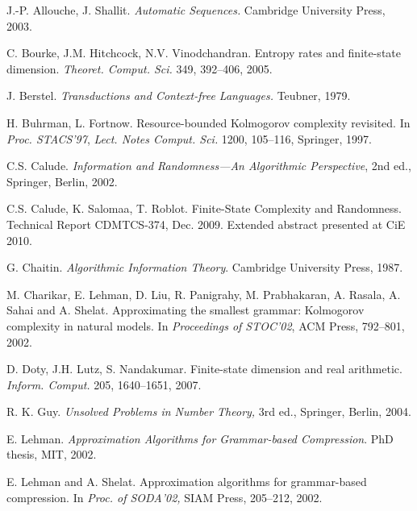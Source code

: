 \documentclass[copyright]{eptcs}
\begin{document}
{\small
\begin{thebibliography}{99}

 J.-P. Allouche, J. Shallit.
{\em Automatic Sequences.} Cambridge University Press, 2003.





 C. Bourke, J.M. Hitchcock,
N.V. Vinodchandran. Entropy rates and finite-state
dimension.
{\em Theoret. Comput. Sci.} 349, 392--406, 2005.

 J. Berstel.
{\em Transductions and Context-free Languages.}
Teubner, 1979.

  H. Buhrman, L. Fortnow. Resource-bounded Kolmogorov complexity
revisited. In {\em  Proc. STACS'97}, {\em Lect. Notes Comput.
Sci.} 1200, 105--116, Springer, 1997.

C.S. Calude.
{\em Information and Randomness---An Algorithmic Perspective}, 2nd
 ed., Springer, Berlin, 2002. 


 C.S. Calude, K. Salomaa, T. Roblot.
Finite-State Complexity and Randomness. 
Technical Report CDMTCS-374, Dec. 2009. Extended
abstract presented at CiE 2010.



 G. Chaitin. {\em Algorithmic Information Theory}. 
Cambridge 
University Press, 1987.

 M. Charikar, E. Lehman, D. Liu, R. Panigrahy,
M. Prabhakaran, A. Rasala, A. Sahai and A. Shelat.
Approximating the smallest grammar: Kolmogorov complexity in natural
models. In {\em  Proceedings of STOC'02}, ACM Press,   792--801, 2002.










 D. Doty, J.H. Lutz, S. Nandakumar.
Finite-state dimension and real arithmetic.
{\em Inform. Comput.} 205, 1640--1651, 2007.


 R. K. Guy.
{\em Unsolved Problems in Number Theory,} 3rd ed.,
Springer, Berlin, 2004.

 E. Lehman.
{\em Approximation Algorithms for Grammar-based Compression}.
PhD thesis, MIT, 2002.

 E. Lehman and A. Shelat.
Approximation algorithms for grammar-based compression.
In {\em Proc. of SODA'02,} SIAM Press,  205--212, 2002.






\end{thebibliography}}
\end{document}
